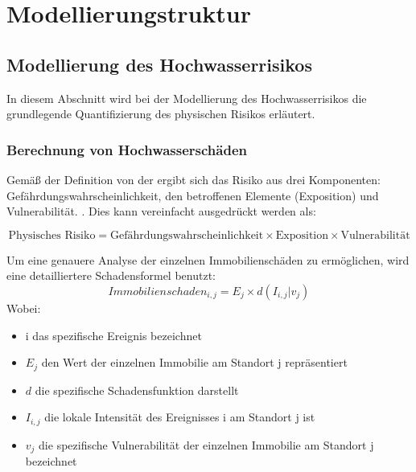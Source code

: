 
\section{Modellierungstruktur}
\subsection{Modellierung des Hochwasserrisikos}
In diesem Abschnitt wird bei der Modellierung des Hochwasserrisikos die grundlegende Quantifizierung des physischen Risikos erläutert.
\subsubsection{Berechnung von Hochwasserschäden}
Gemäß der Definition von der \textcite{undro1979,} ergibt sich das Risiko aus drei Komponenten: Gefährdungswahrscheinlichkeit,  den betroffenen Elemente (Exposition) und Vulnerabilität. \parencite{coburn1991vulnerability}. Dies kann vereinfacht ausgedrückt werden als:

\begin{equation}
    \text{Physisches Risiko} = \text{Gefährdungswahrscheinlichkeit} \times \text{Exposition} \times \text{Vulnerabilität}
\end{equation}

Um eine genauere Analyse der einzelnen Immobilienschäden zu ermöglichen, wird eine detailliertere Schadensformel \parencite{vanweddingen2023physicalrisk} benutzt:
\begin{equation}
    Immobilienschaden_{i,j} = E_j \times d(I_{i,j}|v_j)
    \label{eq:schaden}
\end{equation}
Wobei:
\begin{itemize}
    \item i das spezifische Ereignis bezeichnet
    \item $E_j$ den Wert der einzelnen Immobilie am Standort j repräsentiert
    \item $d$ die spezifische Schadensfunktion darstellt
    \item $I_{i,j}$ die lokale Intensität des Ereignisses i am Standort j ist
    \item $v_j$ die spezifische Vulnerabilität der einzelnen Immobilie am Standort j bezeichnet
\end{itemize}

